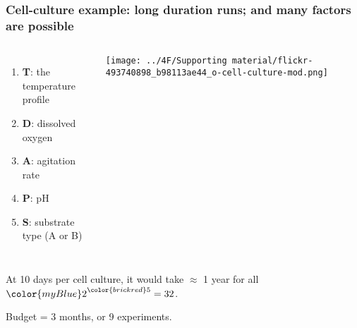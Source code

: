 \documentclass[11pt,aspectratio=169,mathserif]{beamer}
\begin{document}
\begin{frame}\frametitle{Cell-culture example: long duration runs; and many factors are possible}
	\newcommand{\white}{\color{white}}
	\begin{columns}[c]
			\begin{enumerate}
				\item	\textbf{T}: the temperature profile
				\item	\textbf{D}: dissolved oxygen
				\item	\textbf{A}: agitation rate
				\item	\textbf{P}: pH
				\item	\textbf{S}: substrate type (A or B)
			\end{enumerate}
		
			
			\vspace{0.2cm}
			
			\centerline{\texttt{[image: ../4F/Supporting material/flickr-493740898\_b98113ae44\_o-cell-culture-mod.png]}}
	\end{columns}

	\vfill
	At 10 days per cell culture, it would take $\approx$ 1 year for all  ${\color{myBlue} 2}^{\color{brickred} 5} = 32$.
	
	Budget = 3 months, or 9 experiments.
		
\end{frame}
\end{document}
